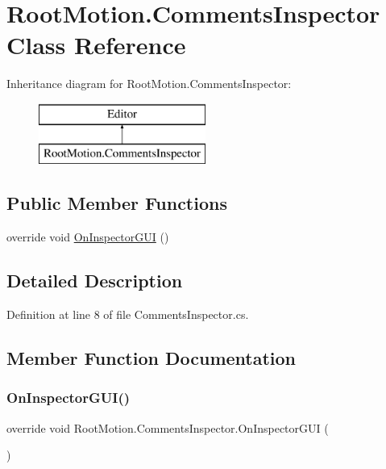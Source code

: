\hypertarget{class_root_motion_1_1_comments_inspector}{}\section{Root\+Motion.\+Comments\+Inspector Class Reference}
\label{class_root_motion_1_1_comments_inspector}
Inheritance diagram for Root\+Motion.\+Comments\+Inspector\+:\begin{figure}[H]
\begin{center}
\leavevmode
\includegraphics[height=2.000000cm]{class_root_motion_1_1_comments_inspector}
\end{center}
\end{figure}
\subsection*{Public Member Functions}
\begin{DoxyCompactItemize}
\item 
override void \mbox{\hyperlink{class_root_motion_1_1_comments_inspector_a1cb15071683ec6e8e2b8b6347051c93c}{On\+Inspector\+G\+UI}} ()
\end{DoxyCompactItemize}


\subsection{Detailed Description}


Definition at line 8 of file Comments\+Inspector.\+cs.



\subsection{Member Function Documentation}
\mbox{\label{class_root_motion_1_1_comments_inspector_a1cb15071683ec6e8e2b8b6347051c93c}} 
\subsubsection{\texorpdfstring{On\+Inspector\+G\+U\+I()}{OnInspectorGUI()}}
{\footnotesize\ttfamily override void Root\+Motion.\+Comments\+Inspector.\+On\+Inspector\+G\+UI (\begin{DoxyParamCaption}{ }\end{DoxyParamCaption})}




